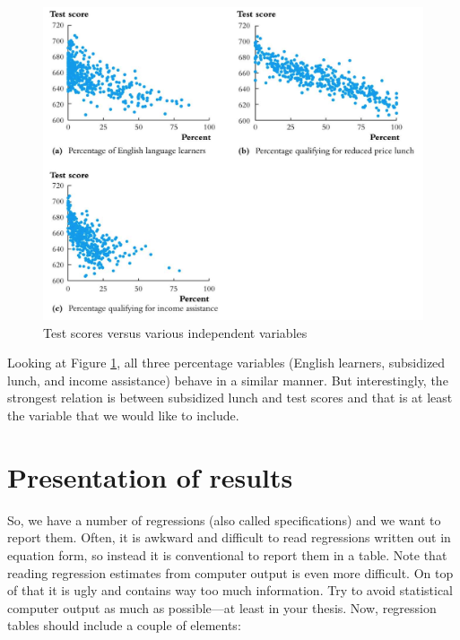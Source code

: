 \documentclass[
]{book}
\begin{document}
\begin{figure}

{\centering \includegraphics[width=800px]{./figures/cadata} 

}

\caption{Test scores versus various independent variables}\label{fig:cadata}
\end{figure}

Looking at Figure \ref{fig:cadata}, all three percentage variables (English learners, subsidized lunch, and income assistance) behave in a similar manner. But interestingly, the strongest relation is between subsidized lunch and test scores and that is at least the variable that we would like to include.

\hypertarget{sec:presentation}{%
\section{Presentation of results}\label{sec:presentation}}

So, we have a number of regressions (also called specifications) and we want to report them. Often, it is awkward and difficult to read regressions written out in equation form, so instead it is conventional to report them in a table. Note that reading regression estimates from computer output is even more difficult. On top of that it is ugly and contains way too much information. Try to avoid statistical computer output as much as possible---at least in your thesis. Now, regression tables should include a couple of elements:
\end{document}

